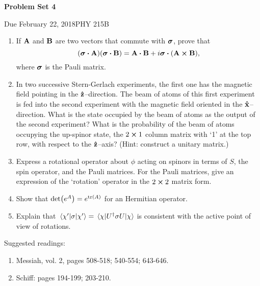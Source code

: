 \documentclass{article}
\newcommand{\Title}     {Problem Set 4}
\newcommand{\DueDate}   {February 22, 2018}
\newcommand{\Course}    {PHY 215B}
\begin{document}
{\huge\textbf{\Title}}

Due \DueDate \hfill \Course

\hrulefill

\begin{enumerate}
    \item If $\vb{A}$ and $\vb{B}$ are two vectors that commute with $\vb*{\sigma}$, prove that
    \[
        (\vb*{\sigma}\vdot\vb{A})(\vb*{\sigma}\vdot\vb{B}) = \vb{A}\vdot\vb{B} + i\vb*{\sigma}\vdot(\vb{A}\cp\vb{B}),
    \]
    where $\vb*{\sigma}$ is the Pauli matrix.

    \item In two successive Stern-Gerlach experiments, the first one has the magnetic field pointing in the $\vu{z}$--direction. The beam of atoms of this first experiment is fed into the second experiment with the magnetic field oriented in the $\vu{x}$--direction. What is the state occupied by the beam of atoms as the output of the second experiment? What is the probability of the beam of atoms occupying the up-spinor state, the $2\cp 1$ column matrix with `1' at the top row, with respect to the $\vu{z}$--axis? (Hint: construct a unitary matrix.)

    \item Express a rotational operator about $\phi$ acting on spinors in terms of $S$, the spin operator, and the Pauli matrices. For the Pauli matrices, give an expression of the `rotation' operator in the $2\cp 2$ matrix form.

    \item Show that $\det(e^A) = e^{\tr(A)}$ for an Hermitian operator.

    \item Explain that $\ev{\sigma}{\chi'} = \ev{U^\dag\sigma U}{\chi}$ is consistent with the active point of view of rotations.
\end{enumerate}

Suggested readings:
\begin{enumerate}[label={}]
    \item Messiah, vol. 2, pages 508-518; 540-554; 643-646.
    \item Schiff: pages 194-199; 203-210.
\end{enumerate}
\end{document}

